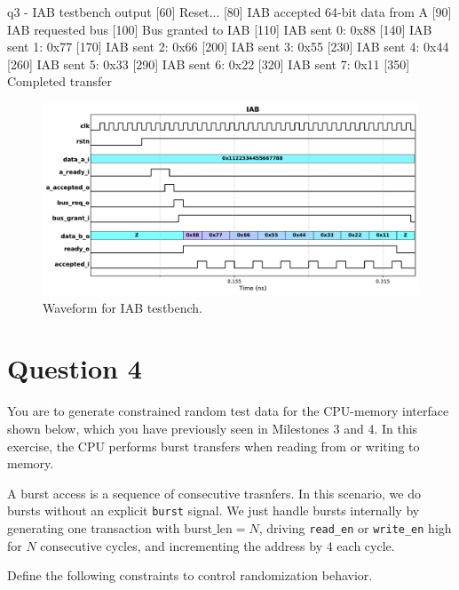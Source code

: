 \documentclass[../main.tex]{subfiles}
\begin{document}
\vspace{-10pt}
\begin{textcode}{q3 - IAB testbench output}
[60] Reset...
[80] IAB accepted 64-bit data from A
[90] IAB requested bus
[100] Bus granted to IAB
[110] IAB sent 0: 0x88
[140] IAB sent 1: 0x77
[170] IAB sent 2: 0x66
[200] IAB sent 3: 0x55
[230] IAB sent 4: 0x44
[260] IAB sent 5: 0x33
[290] IAB sent 6: 0x22
[320] IAB sent 7: 0x11
[350] Completed transfer
\end{textcode}

\vspace{-10pt}
\begin{figure}[H]
    \centering
    \includegraphics[width=\linewidth]{assets/q3_wave.pdf}
    \caption{Waveform for IAB testbench.}
    \label{fig:q3_wave}
\end{figure}

\newpage

\section{Question 4}

You are to generate constrained random test data for the CPU-memory interface shown below, which you have previously seen in Milestones 3 and 4. In this exercise, the CPU performs burst transfers when reading from or writing to memory.

A burst access is a sequence of consecutive trasnfers. In this scenario, we do bursts without an explicit \texttt{burst} signal. We just handle bursts internally by generating one transaction with $\text{burst\_len} = N$, driving \texttt{read\_en} or \texttt{write\_en} high for $N$ consecutive cycles, and incrementing the address by 4 each cycle.

Define the following constraints to control randomization behavior.
\end{document}
